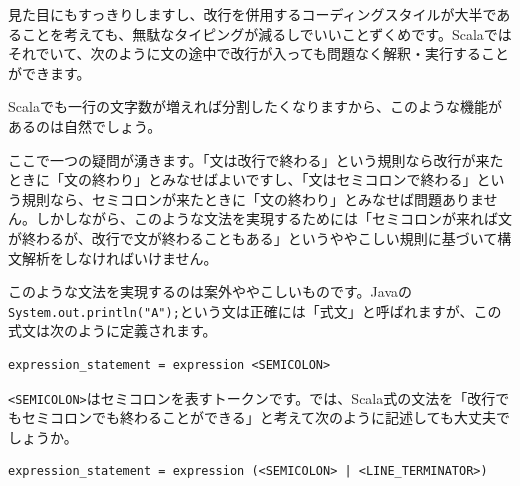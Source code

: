 \begin{Shaded}
\begin{Highlighting}[]
\NormalTok{(}\NormalTok{)}
\NormalTok{(}\NormalTok{)}
\NormalTok{(}\NormalTok{)}
\end{Highlighting}
\end{Shaded}

見た目にもすっきりしますし、改行を併用するコーディングスタイルが大半であることを考えても、無駄なタイピングが減るしでいいことずくめです。Scalaではそれでいて、次のように文の途中で改行が入っても問題なく解釈・実行することができます。

\begin{Shaded}
\begin{Highlighting}[]
\NormalTok{(}
  \NormalTok{)}
\NormalTok{(}
  \NormalTok{)}
\NormalTok{(}
  \NormalTok{)}
\end{Highlighting}
\end{Shaded}

Scalaでも一行の文字数が増えれば分割したくなりますから、このような機能があるのは自然でしょう。

ここで一つの疑問が湧きます。「文は改行で終わる」という規則なら改行が来たときに「文の終わり」とみなせばよいですし、「文はセミコロンで終わる」という規則なら、セミコロンが来たときに「文の終わり」とみなせば問題ありません。しかしながら、このような文法を実現するためには「セミコロンが来れば文が終わるが、改行で文が終わることもある」というややこしい規則に基づいて構文解析をしなければいけません。

このような文法を実現するのは案外ややこしいものです。Javaの\texttt{System.out.println("A");}という文は正確には「式文」と呼ばれますが、この式文は次のように定義されます。

\begin{verbatim}
expression_statement = expression <SEMICOLON>
\end{verbatim}

\texttt{\textless{}SEMICOLON\textgreater{}}はセミコロンを表すトークンです。では、Scala式の文法を「改行でもセミコロンでも終わることができる」と考えて次のように記述しても大丈夫でしょうか。

\begin{verbatim}
expression_statement = expression (<SEMICOLON> | <LINE_TERMINATOR>)
\end{verbatim}

